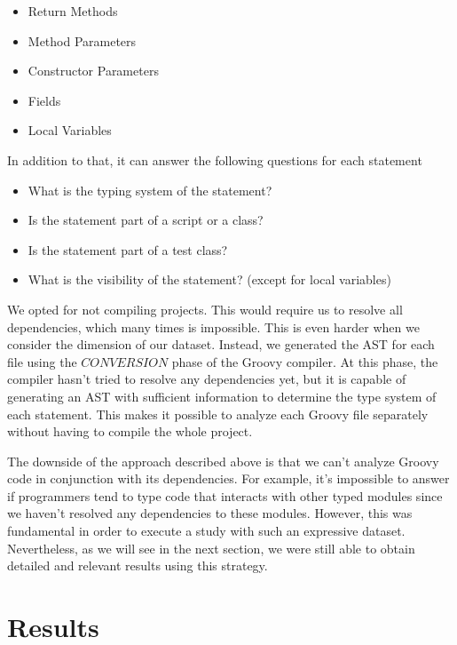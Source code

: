 \documentclass[preprint]{sigplanconf}
\begin{document}
\begin{itemize}
	\item Return Methods
	\item Method Parameters
	\item Constructor Parameters
	\item Fields
	\item Local Variables
\end{itemize}

In addition to that, it can answer the following questions for each statement
\begin{itemize}
	\item What is the typing system of the statement?
	\item Is the statement part of a script or a class?
	\item Is the statement part of a test class?
	\item What is the visibility of the statement? (except for local variables)
\end{itemize}


We opted for not compiling projects.
This would require us to resolve all dependencies, which many times is impossible.
This is even harder when we consider the dimension of our dataset.
Instead, we generated the AST for each file using the $CONVERSION$ phase of the Groovy compiler.
At this phase, the compiler hasn't tried to resolve any dependencies yet, but it is capable of generating an AST with sufficient information to determine the type system of each statement.
This makes it possible to analyze each Groovy file separately without having to compile the whole project.

The downside of the approach described above is that we can't analyze Groovy code in conjunction with its dependencies. 
For example, it's impossible to answer if programmers tend to type code that interacts with other typed modules since we haven't resolved any dependencies to these modules.
However, this was fundamental in order to execute a study with such an expressive dataset.
Nevertheless, as we will see in the next section, we were still able to obtain detailed and relevant results using this strategy.











%
%
\section{Results\label{sec:results}}
\end{document}
